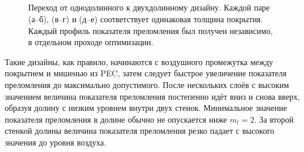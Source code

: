 \begin{figure}[p]
  \begin{minipage}[h]{0.45\textwidth}
  \end{minipage}
  \begin{minipage}[h]{0.45\textwidth}
  \end{minipage}\\
  \vspace{12pt}\\
  \begin{minipage}[h]{0.45\textwidth}
  \end{minipage}
  \begin{minipage}[h]{0.45\textwidth}
  \end{minipage}\\
  \vspace{12pt}\\
  \begin{minipage}[h]{0.45\textwidth}
  \end{minipage}
  \begin{minipage}[h]{0.45\textwidth}
  \end{minipage}%
  \caption{Переход от однодолинного к двухдолинному дизайну. Каждой
    паре (а--б), (в--г) и (д--е) соответствует одинаковая толщина
    покрытия. Каждый профиль показателя преломления был получен
    независимо, в отдельном проходе оптимизации.
    \label{img:transition}}%
\end{figure}
Такие дизайны, как правило, начинаются с воздушного промежутка между
покрытием и мишенью из PEC, затем следует быстрое увеличение
показателя преломления до максимально допустимого. После нескольких
слоёв с высоким значением величина показателя преломления постепенно
идёт вниз и снова вверх, образуя долину с низким уровнем внутри двух
стенок. Минимальное значение показателя
преломления в долине обычно не опускается ниже $m_l = 2$. За второй стенкой
долины величина показателя преломления резко падает с высокого значения до
уровня воздуха.


